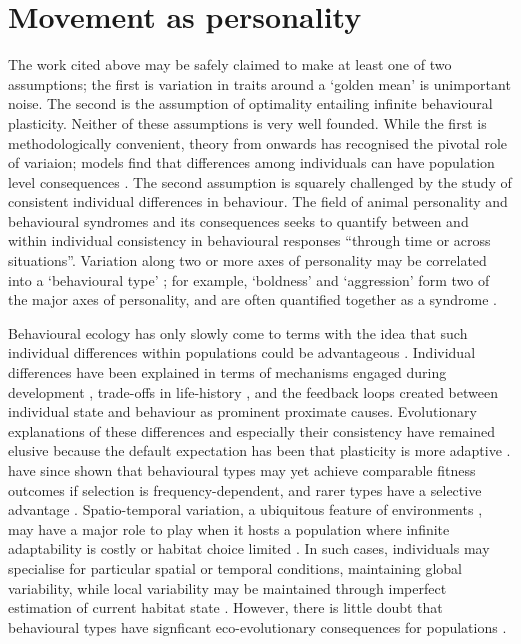 \section{Movement as personality}

The work cited above may be safely claimed to make at least one of two
assumptions; the first is variation in traits around a `golden mean' is
unimportant noise. The second is the assumption of optimality
\citep{fretwell1970} entailing infinite behavioural plasticity. Neither
of these assumptions is very well founded. While the first is
methodologically convenient, theory from \citet{darwin1859} onwards has
recognised the pivotal role of variaion; models find that differences
among individuals can have population level consequences
\citep[e.g.][]{pruitt2011}. The second assumption is squarely challenged
by the study of consistent individual differences in behaviour. The
field of animal personality and behavioural syndromes
\citep{sih2004, sih2004a} and its consequences \citep{dingemanse2005}
seeks to quantify between and within individual consistency in
behavioural responses ``through time or across situations''. Variation
along two or more axes of personality \citep{reale2007} may be
correlated into a `behavioural type' \citep[examples
in][]{sih2008, bell2009}; for example, `boldness' and `aggression' form
two of the major axes of personality, and are often quantified together
as a syndrome \citep{carter2013}.

Behavioural ecology has only slowly come to terms with the idea that
such individual differences within populations could be advantageous
\citep{wilson1998}. Individual differences have been explained in terms
of mechanisms engaged during development
\citep{wolf2010, groothuis2011}, trade-offs in life-history
\citep{wolf2007a, wolf2007}, and the feedback loops created between
individual state and behaviour \citep{wolf2010} as prominent proximate
causes. Evolutionary explanations of these differences and especially
their consistency have remained elusive because the default expectation
has been that plasticity is more adaptive \citep{wilson1998}.
\citet{wolf2010} have since shown that behavioural types may yet achieve
comparable fitness outcomes if selection is frequency-dependent, and
rarer types have a selective advantage \citep{maynardsmith1982}.
Spatio-temporal variation, a ubiquitous feature of environments
\citep{levin1992}, may have a major role to play when it hosts a
population where infinite adaptability is costly or habitat choice
limited \citep{wolf2010}. In such cases, individuals may specialise for
particular spatial or temporal conditions, maintaining global
variability, while local variability may be maintained through imperfect
estimation of current habitat state \citep{wolf2010, wolf2012}. However,
there is little doubt that behavioural types have signficant
eco-evolutionary consequences for populations
\citep{sih2012, wolf2012a}.

